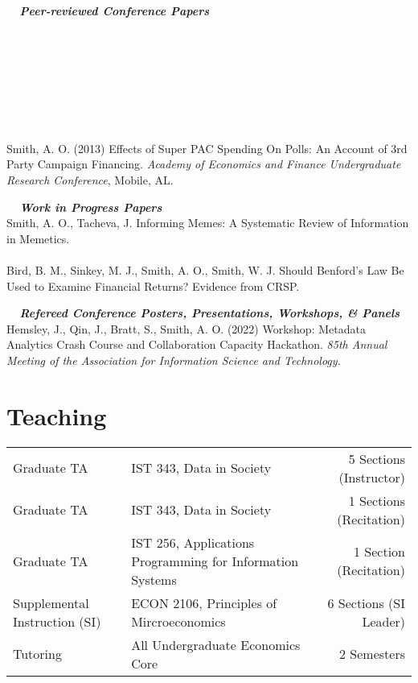 \documentclass[12pt]{article}
\begin{document}
\vspace{2mm}
\noindent \textbf{\textit{\ \ Peer-reviewed Conference Papers}}
\begin{bibunit}\\
\\
\\
\\
\\
\\
\\
Smith, A. O. (2013) Effects of Super PAC Spending On Polls: An Account of 3rd Party Campaign Financing. \emph{Academy of Economics and Finance Undergraduate Research Conference}, Mobile, AL.

\putbib[publications]
\end{bibunit}

\vspace{2mm}
\noindent \textbf{\textit{\ \ Work in Progress Papers \\}}
Smith, A. O., Tacheva, J. Informing Memes: A Systematic Review of Information in Memetics. \\
\\
Bird, B. M., Sinkey, M. J., Smith, A. O., Smith, W. J. Should Benford’s Law Be Used to Examine Financial Returns? Evidence from CRSP.

\vspace{2mm}
\noindent \textbf{\textit{\ \ Refereed Conference Posters, Presentations, Workshops, \& Panels\\}}
Hemsley, J., Qin, J., Bratt, S., Smith, A. O. (2022) Workshop: Metadata Analytics Crash Course and Collaboration Capacity Hackathon. \emph{85th Annual Meeting of the Association for Information Science and Technology.}

\section*{Teaching}
\begin{adjustbox}{width=\textwidth}
\begin{tabular}{l l r}
Graduate TA & IST 343, Data in Society & 5 Sections (Instructor) \\
Graduate TA & IST 343, Data in Society & 1 Sections (Recitation) \\
Graduate TA & IST 256, Applications Programming for Information Systems & 1 Section (Recitation) \\
Supplemental Instruction (SI) & ECON 2106, Principles of Mircroeconomics & 6 Sections (SI Leader)\\
Tutoring & All Undergraduate Economics Core & 2 Semesters \\
\end{tabular}
\end{adjustbox}
\end{document}
